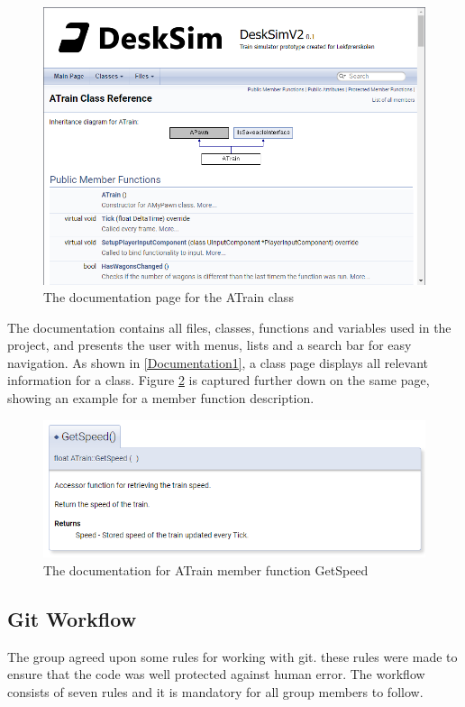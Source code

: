 \begin{figure}[H]
\centerline{\includegraphics[width=1.0\textwidth]{figures/Documentation1.png}}
\caption{The documentation page for the ATrain class}
\label{fig:Documentation1}
\end{figure} 

The documentation contains all files, classes, functions and variables used in the project, and presents the user with menus, lists and a search bar for easy navigation. As shown in \ref{Documentation1}, a class page displays all relevant information for a class. Figure \ref{Documentation2} is captured further down on the same page, showing an example for a member function description. 

\begin{figure}[H]
\centerline{\includegraphics[width=1.0\textwidth]{figures/Documentation2.png}}
\caption{The documentation for ATrain member function GetSpeed}
\label{Documentation2}
\end{figure} 

\subsection{Git Workflow}
The group agreed upon some rules for working with git. these rules were made to ensure that the code was well protected against human error. The workflow consists of seven rules and it is mandatory for all group members to follow.

